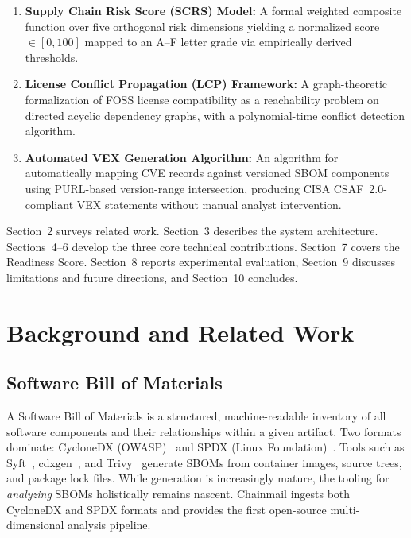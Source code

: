 \documentclass[11pt,twocolumn]{article}
\begin{document}
\begin{enumerate}
  \item \textbf{Supply Chain Risk Score (SCRS) Model:} A formal weighted
    composite function over five orthogonal risk dimensions yielding a normalized
    score $\in [0,100]$ mapped to an A--F letter grade via empirically derived
    thresholds.
  \item \textbf{License Conflict Propagation (LCP) Framework:} A
    graph-theoretic formalization of FOSS license compatibility as a reachability
    problem on directed acyclic dependency graphs, with a polynomial-time conflict
    detection algorithm.
  \item \textbf{Automated VEX Generation Algorithm:} An algorithm for
    automatically mapping CVE records against versioned SBOM components using
    PURL-based version-range intersection, producing CISA CSAF~2.0-compliant VEX
    statements without manual analyst intervention.
\end{enumerate}

Section~2 surveys related work. Section~3 describes the system architecture.
Sections~4--6 develop the three core technical contributions. Section~7 covers the
Readiness Score. Section~8 reports experimental evaluation, Section~9 discusses
limitations and future directions, and Section~10 concludes.

\section{Background and Related Work}

\subsection{Software Bill of Materials}

A Software Bill of Materials is a structured, machine-readable inventory of all
software components and their relationships within a given artifact. Two formats
dominate: CycloneDX (OWASP)~\cite{cyclonedx} and SPDX (Linux
Foundation)~\cite{spdx}. Tools such as Syft~\cite{syft}, cdxgen~\cite{cdxgen},
and Trivy~\cite{trivy} generate SBOMs from container images, source trees, and
package lock files. While generation is increasingly mature, the tooling for
\emph{analyzing} SBOMs holistically remains nascent. Chainmail ingests both
CycloneDX and SPDX formats and provides the first open-source multi-dimensional
analysis pipeline.
\end{document}
